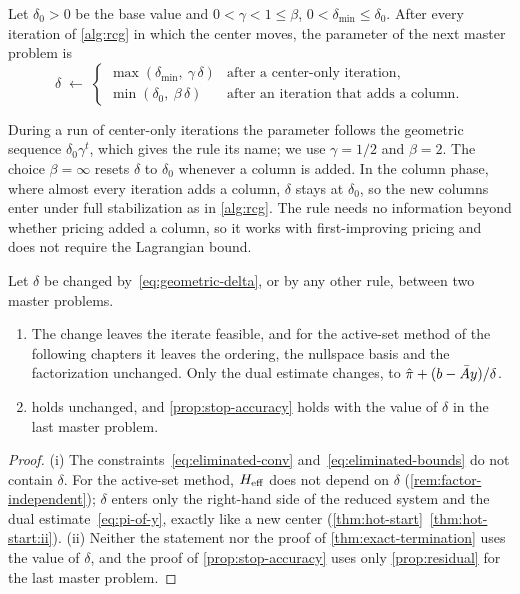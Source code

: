 \begin{definition} \label{def:geometric-delta}
Let $\delta_0>0$ be the base value and $0<\gamma<1\le\beta$, $0<\delta_{\min}\le\delta_0$.
After every iteration of \cref{alg:rcg} in which the center moves, the parameter of the next
master problem is
\begin{equation} \label{eq:geometric-delta}
\delta \;\gets\;
\begin{cases}
\max(\delta_{\min},\ \gamma\,\delta) & \text{after a center-only iteration},\\
\min(\delta_0,\ \beta\,\delta) & \text{after an iteration that adds a column}.
\end{cases}
\end{equation}
\end{definition}

During a run of center-only iterations the parameter follows the geometric sequence
$\delta_0\gamma^t$, which gives the rule its name; we use $\gamma = 1/2$ and $\beta = 2$. The
choice $\beta = \infty$ resets $\delta$ to $\delta_0$ whenever a column is added. In the
column phase, where almost every iteration adds a column, $\delta$ stays at $\delta_0$, so
the new columns enter under full stabilization as in \cref{alg:rcg}. The rule needs no
information beyond whether pricing added a column, so it works with first-improving pricing
and does not require the Lagrangian bound.

\begin{prop} \label{prop:geometric-delta}
Let $\delta$ be changed by~\eqref{eq:geometric-delta}, or by any other rule, between two
master problems.
\begin{enumerate}
    \item \label{prop:geometric-delta:i} The change leaves the iterate feasible, and for the
          active-set method of the following
          chapters it leaves the ordering, the nullspace basis and the factorization
          unchanged. Only the dual estimate changes, to $\hat{\pi} + (b - \bar{A} y)/\delta$.
    \item \label{prop:geometric-delta:ii}  holds unchanged, and
          \cref{prop:stop-accuracy} holds with the value of $\delta$ in the last master
          problem.
\end{enumerate}
\end{prop}

\begin{proof}
(i) The constraints~\eqref{eq:eliminated-conv} and~\eqref{eq:eliminated-bounds} do not contain
$\delta$. For the active-set method, $H_{\mathrm{eff}}$ does not depend on $\delta$
(\cref{rem:factor-independent}); $\delta$ enters only the right-hand side of the reduced
system and the dual estimate~\eqref{eq:pi-of-y}, exactly like a new center
(\cref{thm:hot-start}~\ref{thm:hot-start:ii}).
(ii) Neither the statement nor the proof of \cref{thm:exact-termination} uses the value of
$\delta$, and the proof of \cref{prop:stop-accuracy} uses only \cref{prop:residual} for the
last master problem.
\end{proof}

